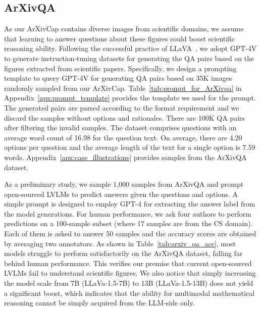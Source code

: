 




% 



\subsection{ArXivQA}
\label{subsec:arxiv_qa}
As our ArXivCap contains diverse images from scientific domains, we assume that learning to answer questions about these figures could boost scientific reasoning ability. Following the successful practice of LLaVA~\citep{liu2023llava}, we adopt GPT-4V to generate instruction-tuning datasets for generating the QA pairs based on the figures extracted from scientific papers.
Specifically, we design a prompting template to query GPT-4V for generating QA pairs based on 35K images randomly sampled from our ArXivCap.
Table~\ref{tab:prompt_for_ArXivqa} in Appendix~\ref{apx:prompt_template} provides the template we used for the prompt.
The generated pairs are parsed according to the format requirement and we discard the samples without options and rationales.
There are 100K QA pairs after filtering the invalid samples. 
The dataset comprises questions with an average word count of 16.98 for the question text.
On average, there are 4.20 options per question and the average length of the text for a single option is 7.59 words.
Appendix~\ref{apx:case_illustrations} provides samples from the ArXivQA dataset.

As a preliminary study, we sample 1,000 samples from ArXivQA and prompt open-sourced LVLMs to predict answers given the questions and options. 
A simple prompt is designed to employ GPT-4 for extracting the answer label from the model generations.
For human performance, we ask four authors to perform predictions on a 100-sample subset (where 17 samples are from the CS domain). Each of them is asked to answer 50 samples and the accuracy scores are obtained by averaging two annotators.
As shown in Table~\ref{tab:arxiv_qa_acc}, most models struggle to perform satisfactorily on the ArXivQA dataset, falling far behind human performance. This verifies our premise that current open-sourced LVLMs fail to understand scientific figures. We also notice that simply increasing the model scale from 7B (LLaVa-1.5-7B) to 13B (LLaVa-1.5-13B) does not yield a significant boost, which indicates that the ability for multimodal mathematical reasoning cannot be simply acquired from the LLM-side only. 






